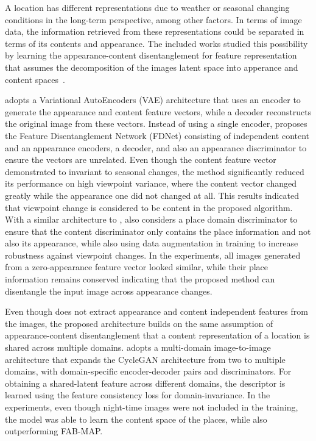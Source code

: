 A location has different representations due to weather or seasonal changing conditions in the long-term perspective, among other factors. In terms of image data, the information retrieved from these representations could be separated in terms of its contents and appearance. The included works studied this possibility by learning the appearance-content disentanglement for feature representation that assumes the decomposition of the images latent space into apperance and content spaces~\parencite{qin-et-al:2020:103561}.

\cite{oh-eoh:2021:app11198976} adopts a Variational AutoEncoders (VAE) architecture that uses an encoder to generate the appearance and content feature vectors, while a decoder reconstructs the original image from these vectors.
Instead of using a single encoder, \cite{qin-et-al:2020:103561} proposes the Feature Disentanglement Network (FDNet) consisting of independent content and an appearance encoders, a decoder, and also an appearance discriminator to ensure the vectors are unrelated. Even though the content feature vector demonstrated to invariant to seasonal changes, the method significantly reduced its performance on high viewpoint variance, where the content vector changed greatly while the appearance one did not changed at all. This results indicated that viewpoint change is considered to be content in the proposed algorithm.
With a similar architecture to \cite{qin-et-al:2020:103561}, \cite{tang-et-al:2021:17298814211037497} also considers a place domain discriminator to ensure that the content discriminator only contains the place information and not also its appearance, while also using data augmentation in training to increase robustness against viewpoint changes. In the experiments, all images generated from a zero-appearance feature vector looked similar, while their place information remains conserved indicating that the proposed method can disentangle the input image across appearance changes.

Even though \cite{hu-et-al:2022:1003907} does not extract appearance and content independent features from the images, the proposed architecture builds on the same assumption of appearance-content disentanglement that a content representation of a location is shared across multiple domains.
\cite{hu-et-al:2022:1003907} adopts a multi-domain image-to-image architecture that expands the CycleGAN architecture from two to multiple domains, with domain-specific encoder-decoder pairs and discriminators.
For obtaining a shared-latent feature across different domains, the descriptor is learned using the feature consistency loss for domain-invariance.
In the experiments, even though night-time images were not included in the training, the model was able to learn the content space of the places, while also outperforming FAB-MAP.




